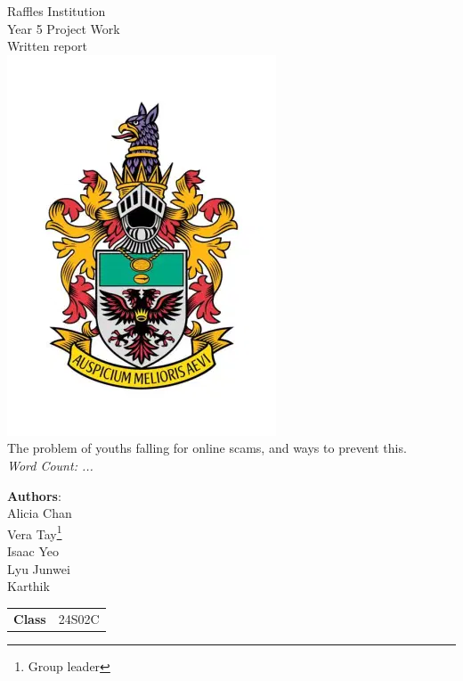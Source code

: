 \documentclass[a4paper]{article}
\begin{document}
\begin{titlepage}
  \Centering
  \Large{Raffles Institution \\ Year 5 Project Work \\ Written report} \\
  \includegraphics[scale=0.5]{ri-school-crest.png} \\
    \huge{The problem of youths falling for online scams, and ways to prevent this.} \\
  \vspace{0.5cm}
  \small{\emph{Word Count: ...}} \\
  \vspace{0.5cm}
  \large{
    \textbf{Authors}: \\
    Alicia Chan \\
    Vera Tay\footnote{Group leader} \\
    Isaac Yeo \\
    Lyu Junwei \\
    Karthik \\
    \vspace{1cm}
    \begin{tabular}{r@{:}l}
      \textbf{Class} & \hspace{1cm} 24S02C \\
    \end{tabular}

  }
\end{titlepage}

\newpage
\end{document}
